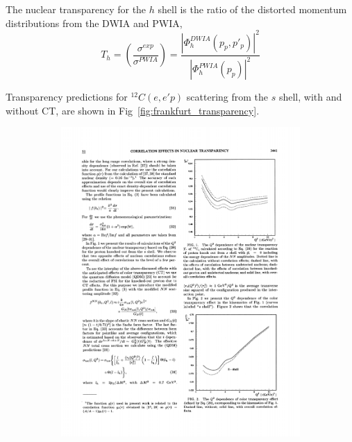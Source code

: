 The nuclear transparency for the $h$ shell is the ratio of the distorted
momentum distributions from the DWIA and PWIA,
\begin{equation}
    T_h = \left(\frac{\sigma^{exp}}{\sigma^{PWIA}}\right)
        = \frac{|\Phi^{DWIA}_h(p_p,p'_p)|^2}
               {|\Phi^{PWIA}_h(p_p)|^2}
\end{equation}

Transparency predictions for ${}^{12}C(e,e'p)$ scattering from the $s$ shell,
with and without CT, are shown in Fig~\ref{fig:frankfurt_transparency}.


\begin{figure}[h]
    \centering
    \begin{subfigure}[b]{0.45\textwidth}
        \centering
        \includegraphics[width=\textwidth]{chap1/frankfurt_transparency_without_CT.pdf}

\end{subfigure}
\end{figure}
